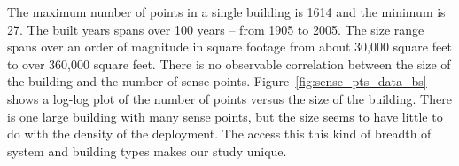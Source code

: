The maximum number of points in a 
single building is 1614 and the minimum is 27.   The built years spans over 100 years -- from 
1905 to 2005. The size range spans over an order of magnitude 
in square footage from about 30,000 square feet to over 360,000 square feet.  There is no
observable correlation between the size of the building and the number of sense points.
Figure~\ref{fig:sense_pts_data_bs} shows a log-log plot of the number of points versus
the size of the building.  There is one large building with many sense points, but the size
seems to have little to do with the density of the deployment.
The access this
this kind of breadth of system and building types makes our study unique.







%

% 



